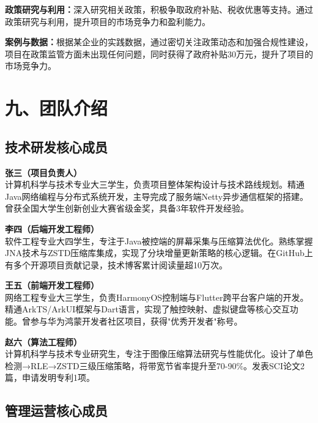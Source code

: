\documentclass[12pt,a4paper]{article}
\begin{document}
\textbf{政策研究与利用：}深入研究相关政策，积极争取政府补贴、税收优惠等支持。通过政策研究与利用，提升项目的市场竞争力和盈利能力。

\textbf{案例与数据：}根据某企业的实践数据，通过密切关注政策动态和加强合规性建设，项目在政策监管方面未出现任何问题，同时获得了政府补贴30万元，提升了项目的市场竞争力。

\section{九、团队介绍}

\subsection{技术研发核心成员}

\textbf{张三（项目负责人）}\\
计算机科学与技术专业大三学生，负责项目整体架构设计与技术路线规划。精通Java网络编程与分布式系统开发，主导完成了服务端Netty异步通信框架的搭建。曾获全国大学生创新创业大赛省级金奖，具备3年软件开发经验。

\textbf{李四（后端开发工程师）}\\
软件工程专业大四学生，专注于Java被控端的屏幕采集与压缩算法优化。熟练掌握JNA技术与ZSTD压缩库集成，实现了分块增量更新策略的核心逻辑。在GitHub上有多个开源项目贡献记录，技术博客累计阅读量超10万次。

\textbf{王五（前端开发工程师）}\\
网络工程专业大三学生，负责HarmonyOS控制端与Flutter跨平台客户端的开发。精通ArkTS/ArkUI框架与Dart语言，实现了触控映射、虚拟键盘等核心交互功能。曾参与华为鸿蒙开发者社区项目，获得"优秀开发者"称号。

\textbf{赵六（算法工程师）}\\
计算机科学与技术专业研究生，专注于图像压缩算法研究与性能优化。设计了单色检测→RLE→ZSTD三级压缩策略，将带宽节省率提升至70-90\%。发表SCI论文2篇，申请发明专利1项。

\subsection{管理运营核心成员}
\end{document}
